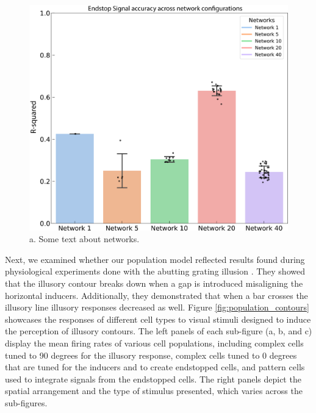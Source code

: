 \documentclass[12pt]{article}
\begin{document}
\begin{figure}[H]
  \centering
  \includegraphics[width=1.0 \textwidth]{adjusted_figures/figure_networks_bar.png}
  \caption{a. Some text about networks.}
  \label{fig:endstop_network}
\end{figure}
Next, we examined whether our population model reflected results found during physiological experiments done with the abutting grating illusion \autocite{vonderheydtMechanismsContourPerception1989}. They showed that the illusory contour breaks down when a gap is introduced misaligning the horizontal inducers. Additionally, they demonstrated that when a bar crosses the illusory line illusory responses decreased as well. Figure \ref{fig:population_contours} showcases the responses of different cell types to visual stimuli designed to induce the perception of illusory contours. The left panels of each sub-figure (a, b, and c) display the mean firing rates of various cell populations, including complex cells tuned to 90 degrees for the illusory response, complex cells tuned to 0 degrees that are tuned for the inducers and to create endstopped cells, and pattern cells used to integrate signals from the endstopped cells. The right panels depict the spatial arrangement and the type of stimulus presented, which varies across the sub-figures.
\end{document}
